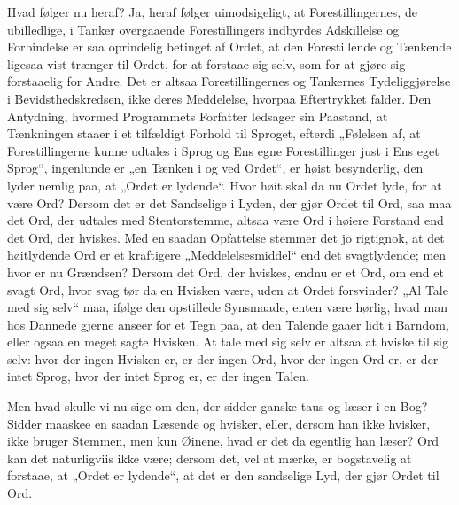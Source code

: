 \documentclass[12pt]{book}
\newcommand{\opage}[1]{\marginnote{\footnotesize\textit{[#1]}}}
\begin{document}
Hvad følger nu heraf? Ja, heraf følger uimodsigeligt,
at Forestillingernes, de ubilledlige, i Tanker overgaaende Forestillingers
indbyrdes Adskillelse og Forbindelse er saa oprindelig
betinget af Ordet, at den Forestillende og Tænkende
ligesaa vist trænger til Ordet, for at forstaae sig selv, som
for at gjøre sig forstaaelig for Andre. Det er altsaa Forestillingernes
og Tankernes Tydeliggjørelse i Bevidsthedskredsen,
ikke deres Meddelelse, hvorpaa Eftertrykket falder. Den Antydning,
hvormed Programmets Forfatter ledsager sin Paastand,
at Tænkningen staaer i et tilfældigt Forhold til Sproget,
efterdi „Følelsen af, at Forestillingerne kunne udtales i Sprog
og Ens egne Forestillinger just i Ens eget Sprog“, ingenlunde
er „en Tænken i og ved Ordet“, er høist besynderlig, den
lyder nemlig paa, at „Ordet er lydende“. Hvor høit skal
da nu Ordet lyde, for at være Ord? Dersom det er det
Sandselige i Lyden, der gjør Ordet til Ord, saa maa det
Ord, der udtales med Stentorstemme, altsaa være Ord i
høiere Forstand end det Ord, der hviskes. Med en saadan
Opfattelse stemmer det jo rigtignok, at det høitlydende Ord er
et kraftigere „Meddelelsesmiddel“ end det svagtlydende; men
hvor er nu Grændsen? Dersom det Ord, der hviskes, endnu
er et Ord, om end et svagt Ord, hvor svag tør da en Hvisken
være, uden at Ordet forsvinder? „Al Tale med sig selv“
maa, ifølge den opstillede Synsmaade, enten være hørlig,
hvad man hos Dannede gjerne anseer for et Tegn paa, at den
Talende gaaer lidt i Barndom, eller ogsaa en meget sagte
Hvisken. At tale med sig selv er altsaa at hviske til sig selv:
\opage{24}hvor der ingen Hvisken er, er der ingen Ord, hvor der ingen
Ord er, er der intet Sprog, hvor der intet Sprog er, er der
ingen Talen.

Men hvad skulle vi nu sige om den, der sidder ganske
taus og læser i en Bog? Sidder maaskee en saadan Læsende
og hvisker, eller, dersom han ikke hvisker, ikke bruger Stemmen,
men kun Øinene, hvad er det da egentlig han læser? Ord
kan det naturligviis ikke være; dersom det, vel at mærke, er
bogstavelig at forstaae, at „Ordet er lydende“, at det er den
sandselige Lyd, der gjør Ordet til Ord.
\end{document}
